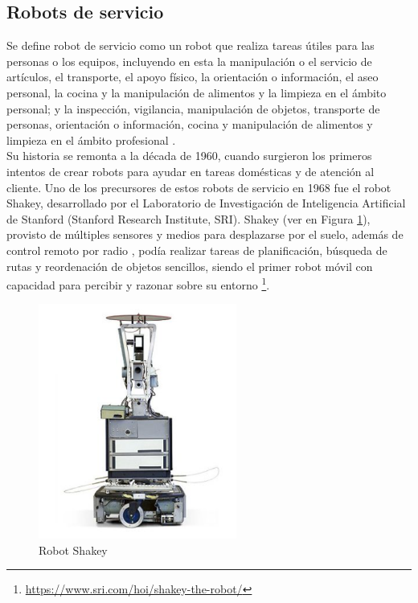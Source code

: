 \pagebreak
   
\subsection{Robots de servicio}
\label{sec:robot_servicio}

Se define robot de servicio como un robot que realiza tareas útiles para las personas o los equipos, incluyendo en esta la manipulación o el servicio de artículos, el transporte, el apoyo físico, la orientación o información, el aseo personal, la cocina y la manipulación de alimentos y la limpieza en el ámbito personal; y la inspección, vigilancia, manipulación de objetos, transporte de personas, orientación o información, cocina y manipulación de alimentos y limpieza en el ámbito profesional \cite{ISO8373}.\\

Su historia se remonta a la década de 1960, cuando surgieron los primeros intentos de crear robots para ayudar en tareas domésticas y de atención al cliente. Uno de los precursores de estos robots de servicio en 1968 fue el robot Shakey, desarrollado por el Laboratorio de Investigación de Inteligencia Artificial de Stanford (Stanford Research Institute, SRI). Shakey (ver en Figura \ref{fig:shakey}), provisto de múltiples sensores y medios para desplazarse por el suelo, además de control remoto por radio \cite{Sanchez07b}, podía realizar tareas de planificación, búsqueda de rutas y reordenación de objetos sencillos, siendo el primer robot móvil con capacidad para percibir y razonar sobre su entorno \footnote{\url{https://www.sri.com/hoi/shakey-the-robot/}}. 

  \begin{figure} [H]
    \begin{center}
      \includegraphics[width=65mm]{figs/Shakey.png}
    \end{center}
    \caption{Robot Shakey}
    \label{fig:shakey}
  \end{figure}
  
